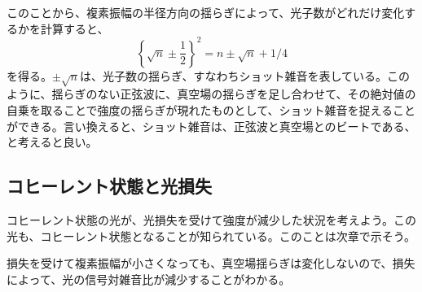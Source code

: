 このことから、複素振幅の半径方向の揺らぎによって、光子数がどれだけ変化するかを計算すると、
\begin{equation}
  \left\{\sqrt n \pm \frac 1 2\right\}^2 = n \pm \sqrt n + 1/4
\end{equation}
を得る。$\pm \sqrt n$は、光子数の揺らぎ、すなわちショット雑音を表している。このように、揺らぎのない正弦波に、真空場の揺らぎを足し合わせて、その絶対値の自乗を取ることで強度の揺らぎが現れたものとして、ショット雑音を捉えることができる。言い換えると、ショット雑音は、正弦波と真空場とのビートである、と考えると良い。



\subsection{コヒーレント状態と光損失}
コヒーレント状態の光が、光損失を受けて強度が減少した状況を考えよう。この光も、コヒーレント状態となることが知られている。このことは次章で示そう。

損失を受けて複素振幅が小さくなっても、真空場揺らぎは変化しないので、損失によって、光の信号対雑音比が減少することがわかる。

